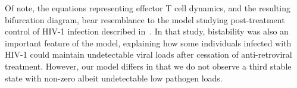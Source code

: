 Of note, the equations representing effector T cell dynamics, and the resulting bifurcation diagram, bear resemblance to the model studying post-treatment control of HIV-1 infection described in~\cite{conway2015post}. In that study, bistability was also an important feature of the model, explaining how some individuals infected with HIV-1 could maintain undetectable viral loads after cessation of anti-retroviral treatment. However, our model differs in that we do not observe a third stable state with non-zero albeit undetectable low pathogen loads.

\renewcommand{\thetable}{\thechapter.\arabic{table}}
\setcounter{table}{0}

\renewcommand{\thefigure}{\thechapter.\arabic{figure}}
\renewcommand{\figurename}{Figure}
\setcounter{figure}{0}